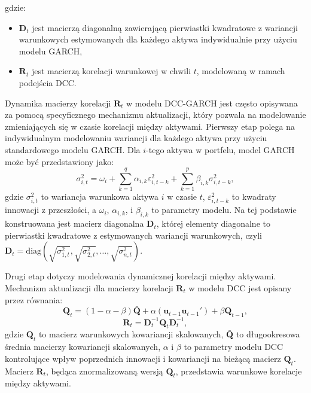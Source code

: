 \begin{enumerate}
gdzie:
\begin{itemize}
    \item \(\mathbf{D}_t\) jest macierzą diagonalną zawierającą pierwiastki kwadratowe z wariancji warunkowych estymowanych dla każdego aktywa indywidualnie przy użyciu modelu GARCH,
    \item \(\mathbf{R}_t\) jest macierzą korelacji warunkowej w chwili \(t\), modelowaną w ramach podejścia DCC.
\end{itemize}

Dynamika macierzy korelacji \(\mathbf{R}_t\) w modelu DCC-GARCH jest często opisywana za pomocą specyficznego mechanizmu aktualizacji, który pozwala na modelowanie zmieniających się w czasie korelacji między aktywami. Pierwszy etap polega na indywidualnym modelowaniu wariancji dla każdego aktywa przy użyciu standardowego modelu GARCH. Dla \(i\)-tego aktywa w portfelu, model GARCH może być przedstawiony jako:
\begin{equation}
\sigma_{i,t}^2 = \omega_i + \sum_{k=1}^{q} \alpha_{i,k} \varepsilon_{i,t-k}^2 + \sum_{k=1}^{p} \beta_{i,k} \sigma_{i,t-k}^2,
\end{equation}
gdzie \( \sigma_{i,t}^2 \) to wariancja warunkowa aktywa \(i\) w czasie \(t\), \( \varepsilon_{i,t-k}^2 \) to kwadraty innowacji z przeszłości, a \( \omega_i \), \( \alpha_{i,k} \), i \( \beta_{i,k} \) to parametry modelu. Na tej podstawie konstruowana jest macierz diagonalna \( \mathbf{D}_t \), której elementy diagonalne to pierwiastki kwadratowe z estymowanych wariancji warunkowych, czyli \( \mathbf{D}_t = \text{diag}(\sqrt{\sigma_{1,t}^2}, \sqrt{\sigma_{2,t}^2}, \ldots, \sqrt{\sigma_{n,t}^2}) \).

Drugi etap dotyczy modelowania dynamicznej korelacji między aktywami. Mechanizm aktualizacji dla macierzy korelacji \( \mathbf{R}_t \) w modelu DCC jest opisany przez równania:
\begin{equation}
\mathbf{Q}_t = (1 - \alpha - \beta) \bar{\mathbf{Q}} + \alpha (\mathbf{u}_{t-1} \mathbf{u}_{t-1}') + \beta \mathbf{Q}_{t-1},
\end{equation}
\begin{equation}
\mathbf{R}_t = \mathbf{D}_t^{-1} \mathbf{Q}_t \mathbf{D}_t^{-1},
\end{equation}
gdzie \( \mathbf{Q}_t \) to macierz warunkowych kowariancji skalowanych, \( \bar{\mathbf{Q}} \) to długookresowa średnia macierzy kowariancji skalowanych, \( \alpha \) i \( \beta \) to parametry modelu DCC kontrolujące wpływ poprzednich innowacji i kowariancji na bieżącą macierz \( \mathbf{Q}_t \). Macierz \( \mathbf{R}_t \), będąca znormalizowaną wersją \( \mathbf{Q}_t \), przedstawia warunkowe korelacje między aktywami.


\end{enumerate}
